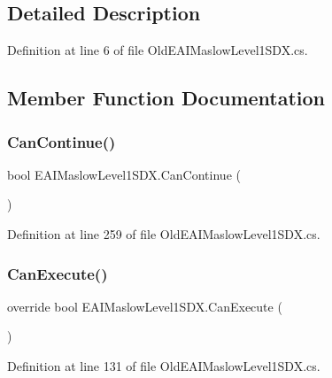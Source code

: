 \subsection{Detailed Description}


Definition at line 6 of file Old\+E\+A\+I\+Maslow\+Level1\+S\+D\+X.\+cs.



\subsection{Member Function Documentation}
\mbox{\label{class_e_a_i_maslow_level1_s_d_x_a30c55e1fa6c0fb13fa3f0e5dfa0e2d0a}} 
\subsubsection{\texorpdfstring{CanContinue()}{CanContinue()}}
{\footnotesize\ttfamily bool E\+A\+I\+Maslow\+Level1\+S\+D\+X.\+Can\+Continue (\begin{DoxyParamCaption}{ }\end{DoxyParamCaption})}



Definition at line 259 of file Old\+E\+A\+I\+Maslow\+Level1\+S\+D\+X.\+cs.

\mbox{\label{class_e_a_i_maslow_level1_s_d_x_a4875de22593103de62decf09a07132bb}} 
\subsubsection{\texorpdfstring{CanExecute()}{CanExecute()}}
{\footnotesize\ttfamily override bool E\+A\+I\+Maslow\+Level1\+S\+D\+X.\+Can\+Execute (\begin{DoxyParamCaption}{ }\end{DoxyParamCaption})}



Definition at line 131 of file Old\+E\+A\+I\+Maslow\+Level1\+S\+D\+X.\+cs.

\mbox{\label{class_e_a_i_maslow_level1_s_d_x_a5fb2f5ad8c518f78e0256c72eeaba1a5}} 
